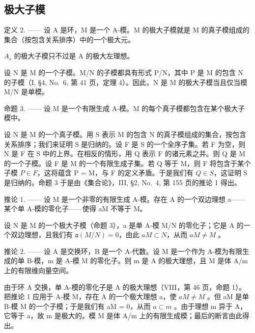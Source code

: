 \subsection{极大子模}

定义 2. —— 设 A 是环，M 是一个 A-模。M 的极大子模就是 M 的真子模组成的集合（按包含关系排序）中的一个极大元。

\(A_{s}\) 的极大子模只不过是 A 的极大左理想。

设 N 是 M 的一个子模。M/N 的子模都具有形式 P/N，其中 P 是 M 的包含 N 的子模（I, §4, No.~6, 第 41 页，定理 4）。因此，N 是 M 的极大子模当且仅当模 M/N 是单模。

命题 3. —— 设 M 是一个有限生成 A-模。M 的每个真子模都包含在某个极大子模中。

设 N 是 M 的一个真子模。用 S 表示 M 的包含 N 的真子模组成的集合，按包含关系排序；我们来证明 S 是归纳的。设 F 是 S 的一个全序子集。若 F 为空，则 N 是 F 在 S 中的上界。在相反的情形，用 Q 表示 F 的诸元素之并。则 Q 是 M 的一个子模。设 F 是 M 的一个有限生成子集。若 Q 等于 M，则 F 将包含于某个子模 \(P \in F\)，这将蕴含 P = M，与 F 的定义矛盾。于是我们有 \(Q \in S\)，这证明 S 是归纳的。命题 3 于是由《集合论》，III, §2, No.~4, 第 155 页的推论 1 得出。

推论 1. —— 设 M 是一个非零的有限生成 A-模。存在 A 的一个双边理想 a——某个单 A-模的零化子——使得 aM 不等于 M。

设 N 是 M 的一个极大子模（命题 3），a 是单 A-模 M/N 的零化子；它是 A 的一个双边理想，且我们有 \(\mathfrak{a}(M/N)=0\)，由此 \(aM\subset N\)，从而 \(aM\neq M\) 。

推论 2. —— 设 A 是交换环，B 是一个 A-代数。设 M 是一个作为 A-模为有限生成的单 B-模，m 是 A-模 M 的零化子。则 m 是 A 的极大理想，且 M 是体 A/m 上的有限维向量空间。

由于环 A 交换，单 A-模的零化子是 A 的极大理想（VIII，第 46 页，命题 1）。把推论 1 应用于 A-模 M，存在 A 的一个极大理想 a，使 \(aM \neq M\) 。但 aM 是单 B-模 M 的一个子模；于是我们有 aM = 0，从而 \(a \subset m\) 。由于理想 m 异于 A，它等于 a，故 m 是极大的。模 M 是体 A/m 上的有限生成模；最后的断言由此得出。

